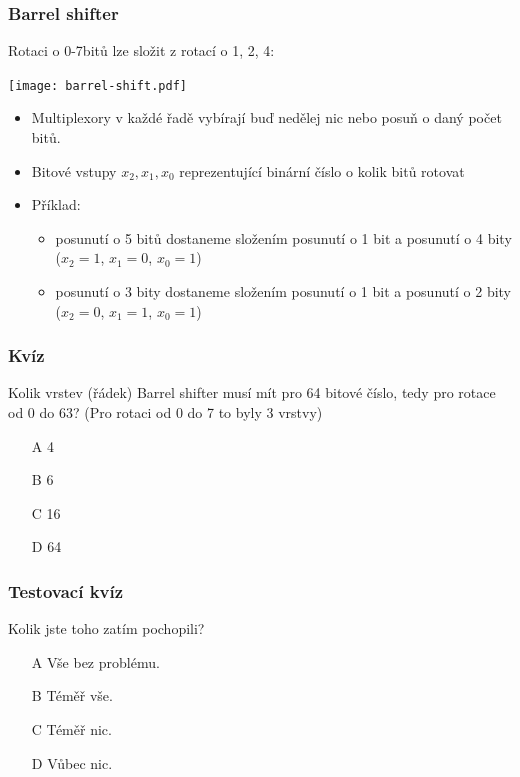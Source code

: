 \documentclass{beamer}
\begin{document}
\begin{frame}
\frametitle{Barrel shifter}

Rotaci o 0-7bitů lze složit z rotací o 1, 2, 4:
\begin{center}
   \texttt{[image: barrel-shift.pdf]}
\end{center}

\begin{itemize}
\item Multiplexory v každé řadě vybírají buď nedělej nic nebo posuň o daný počet bitů.
\item Bitové vstupy $x_2,x_1,x_0$ reprezentující binární číslo o kolik bitů rotovat
\item Příklad:
\begin{itemize}
\item posunutí o 5 bitů dostaneme složením posunutí o 1 bit a posunutí o 4 bity ($x_2=1$, $x_1=0$, $x_0=1$)
\item posunutí o 3 bity dostaneme složením posunutí o 1 bit a posunutí o 2 bity ($x_2=0$, $x_1=1$, $x_0=1$)
\end{itemize}
\end{itemize}

\end{frame}


\begin{frame}
\frametitle{Kvíz}

Kolik vrstev (řádek) Barrel shifter musí mít pro 64 bitové číslo, tedy pro rotace od 0 do 63? (Pro rotaci od 0 do 7 to byly 3 vrstvy)
\begin{itemize}
\item[A] 4
\item[B] 6
\item[C] 16
\item[D] 64
\end{itemize}

\end{frame}


\begin{frame}
\frametitle{Testovací kvíz}

Kolik jste toho zatím pochopili?
\begin{itemize}
\item[A] Vše bez problému.
\item[B] Téměř vše.
\item[C] Téměř nic.
\item[D] Vůbec nic.
\end{itemize}

\end{frame}
\end{document}
